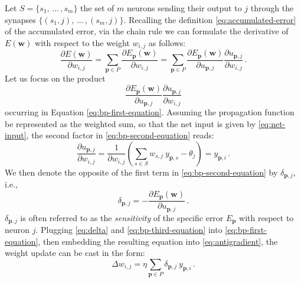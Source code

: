 \documentclass[12pt, a4paper, twoside, openright]{report}
\numberwithin{equation}{chapter}
\theoremstyle{theorem}
\theoremstyle{definition}
\theoremstyle{remark}
\theoremstyle{proposition}
\numberwithin{figure}{chapter}
\begin{document}
		Let $S = \big\lbrace s_1, \, \ldots \, , s_m \big\rbrace$ the set of $m$ neurons sending their output to $j$ through the synapses $\big\lbrace (s_1,j), \, \ldots \, , (s_m,j) \big\rbrace$. Recalling the definition \eqref{eq:accumulated-error} of the accumulated error, via the chain rule we can formulate the derivative of $E(\mathbf{w})$ with respect to the weight $w_{i,j}$ as follows:
		\begin{equation}
			\label{eq:bp-first-equation}
			\dfrac{\partial E(\mathbf{w})}{\partial w_{i,j}} = \sum_{\mathbf{p} \in P} \dfrac{\partial E_{\mathbf{p}}(\mathbf{w})}{\partial w_{i,j}} = \sum_{\mathbf{p} \in P} \dfrac{\partial E_{\mathbf{p}}(\mathbf{w})}{\partial u_{\mathbf{p},j}} \dfrac{\partial u_{\mathbf{p},j}}{\partial w_{i,j}} \, .
		\end{equation}
		Let us focus on the product
		\begin{equation}
			\label{eq:bp-second-equation}
			\dfrac{\partial E_{\mathbf{p}}(\mathbf{w})}{\partial u_{\mathbf{p},j}} \dfrac{\partial u_{\mathbf{p},j}}{\partial w_{i,j}}
		\end{equation}
		occurring in Equation \eqref{eq:bp-first-equation}. Assuming the propagation function be represented as the weighted sum, so that the net input is given by \eqref{eq:net-input}, the second factor in \eqref{eq:bp-second-equation} reads:
		\begin{equation}
			\label{eq:bp-third-equation}
			\dfrac{\partial u_{\mathbf{p},j}}{\partial w_{i,j}} = \dfrac{1}{\partial w_{i,j}} \left( \sum_{s \in S} w_{s,j} ~ y_{\mathbf{p},s} - \theta_j \right) = y_{\mathbf{p},i} \, .
		\end{equation}
		We then denote the opposite of the first term in \eqref{eq:bp-second-equation} by $\delta_{\mathbf{p},j}$, i.e.,
		\begin{equation}
			\label{eq:delta}
			\delta_{\mathbf{p},j} = - \dfrac{\partial E_{\mathbf{p}}(\mathbf{w})}{\partial u_{\mathbf{p},j}} \, .
		\end{equation} 
		$\delta_{\mathbf{p},j}$ is often referred to as the \emph{sensitivity} of the specific error $E_{\mathbf{p}}$ with respect to neuron $j$. Plugging \eqref{eq:delta} and \eqref{eq:bp-third-equation} into \eqref{eq:bp-first-equation}, then embedding the resulting equation into \eqref{eq:antigradient}, the weight update can be cast in the form:
		\begin{equation}
			\label{eq:bp-weight-update}
			\Delta w_{i,j} = \eta \sum_{\mathbf{p} \in P} \delta_{\mathbf{p},j} ~ y_{\mathbf{p},i} \, .
		\end{equation}
\end{document}
